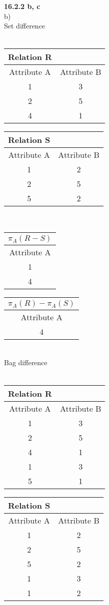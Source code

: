 \documentclass[12pt, letterpaper, fleqn]{article}
\begin{document}
  \textbf{16.2.2 b, c} \\
  b) \\
  Set difference\\\\
  \begin{tabular} {|c c|}
    \hline
    Relation R & \\ \hline
    Attribute A & Attribute B \\ \hline
    1  &  3 \\
    2  &  5 \\
    4  &  1 \\
    \hline
  \end{tabular}
  \begin{tabular} {| c c |}
    \hline
    Relation S & \\ \hline
    Attribute A & Attribute B \\  \hline
    1  &  2 \\
    2  &  5 \\
    5  &  2 \\ \hline
  \end{tabular} \\
  
  \begin{tabular} {| c |}
    \hline
    $\pi_A (R - S)$   \\ \hline
    Attribute A  \\ \hline
    1  \\
    4  \\ \hline
  \end{tabular} 

  \begin{tabular} {| c |}
    \hline
    $\pi_A (R) - \pi_A (S)$  \\ \hline
    Attribute A  \\ \hline
    4  \\ \hline
  \end{tabular} \\

  Bag difference\\\\
  \begin{tabular} {|c c|}
    \hline
    Relation R & \\ \hline
    Attribute A & Attribute B \\ \hline
    1  &  3 \\
    2  &  5 \\
    4  &  1 \\
    1  &  3 \\ 
    5  &  1 \\
    \hline
  \end{tabular}
  \begin{tabular} {| c c |}
    \hline
    Relation S & \\ \hline
    Attribute A & Attribute B \\  \hline
    1  &  2 \\
    2  &  5 \\
    5  &  2 \\
    1  &  3 \\
    1  &  2 \\ \hline
  \end{tabular} \\
  
\end{document}
